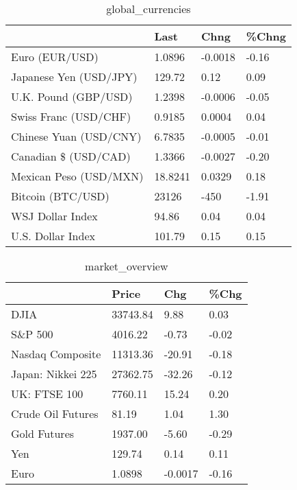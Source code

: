 \documentclass{article}%
\begin{document}
%


\begin{table}[htbp]%
\caption{global\_currencies}%
\centering%
\begin{adjustbox}{width=1\textwidth}%
\begin{tabular}{llll}
\toprule
                       &    Last &    Chng & \%Chng \\
\midrule
        Euro (EUR/USD) &  1.0896 & -0.0018 & -0.16 \\
Japanese Yen (USD/JPY) &  129.72 &    0.12 &  0.09 \\
  U.K. Pound (GBP/USD) &  1.2398 & -0.0006 & -0.05 \\
 Swiss Franc (USD/CHF) &  0.9185 &  0.0004 &  0.04 \\
Chinese Yuan (USD/CNY) &  6.7835 & -0.0005 & -0.01 \\
  Canadian \$ (USD/CAD) &  1.3366 & -0.0027 & -0.20 \\
Mexican Peso (USD/MXN) & 18.8241 &  0.0329 &  0.18 \\
     Bitcoin (BTC/USD) &   23126 &    -450 & -1.91 \\
      WSJ Dollar Index &   94.86 &    0.04 &  0.04 \\
     U.S. Dollar Index &  101.79 &    0.15 &  0.15 \\
\bottomrule
\end{tabular}
%
\end{adjustbox}%
\end{table}

%


\begin{table}[htbp]%
\caption{market\_overview}%
\centering%
\begin{adjustbox}{width=1\textwidth}%
\begin{tabular}{llll}
\toprule
                  &    Price &     Chg &  \%Chg \\
\midrule
             DJIA & 33743.84 &    9.88 &  0.03 \\
          S\&P 500 &  4016.22 &   -0.73 & -0.02 \\
 Nasdaq Composite & 11313.36 &  -20.91 & -0.18 \\
Japan: Nikkei 225 & 27362.75 &  -32.26 & -0.12 \\
     UK: FTSE 100 &  7760.11 &   15.24 &  0.20 \\
Crude Oil Futures &    81.19 &    1.04 &  1.30 \\
     Gold Futures &  1937.00 &   -5.60 & -0.29 \\
              Yen &   129.74 &    0.14 &  0.11 \\
             Euro &   1.0898 & -0.0017 & -0.16 \\
\bottomrule
\end{tabular}
%
\end{adjustbox}%
\end{table}

%
\end{document}
